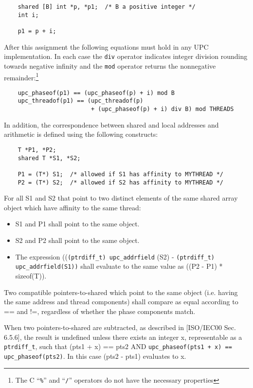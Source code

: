 \documentclass[12pt,titlepage]{article}
\newcounter{parnum}
\newcommand\np{\addtocounter{parnum}{1}\hspace{-2em}\makebox[2em][l]{\arabic{parnum}}}
\begin{document}
      
\begin{verbatim}
    shared [B] int *p, *p1;  /* B a positive integer */ 
    int i;  

    p1 = p + i;  
\end{verbatim}
    
\np After this assignment the following equations must hold
   in any UPC implementation.  In each case the {\tt div} operator
   indicates integer division rounding towards negative infinity and
   the {\tt mod} operator returns the nonnegative
   remainder:\footnote{The C ``{\tt \%}'' and ``{\tt /}''
   operators do not have the necessary properties}

    
\begin{verbatim}
    upc_phaseof(p1) == (upc_phaseof(p) + i) mod B 
    upc_threadof(p1) == (upc_threadof(p) 
                         + (upc_phaseof(p) + i) div B) mod THREADS 
\end{verbatim}    

\np In addition, the correspondence between shared and
   local addresses and arithmetic is defined using the following
   constructs:

\begin{verbatim}
    T *P1, *P2;  
    shared T *S1, *S2;  

    P1 = (T*) S1;  /* allowed if S1 has affinity to MYTHREAD */ 
    P2 = (T*) S2;  /* allowed if S2 has affinity to MYTHREAD */ 
\end{verbatim}    
    

\np For all S1 and S2 that point to two distinct elements of
   the same shared array object which have affinity to the same
   thread:

\begin{itemize}
\item S1 and P1 shall point to the same object. 
\item S2 and P2 shall point to the same object. 
\item The expression (({\tt (ptrdiff\_t) upc\_addrfield} (S2) -  {\tt (ptrdiff\_t) upc\_addrfield(S1))} shall 
   evaluate to the same value as ((P2 - P1) * sizeof(T)).  
\end{itemize}

\np Two compatible pointers-to-shared which point to the same
    object (i.e. having the same address and thread components) shall
    compare as equal according to == and !=, regardless of whether the 
    phase components match.

\np When two pointers-to-shared are subtracted, as described in
    [ISO/IEC00 Sec. 6.5.6], the result is undefined unless there exists
    an integer x, representable as a {\tt ptrdiff\_t}, such that (pts1 + x) == pts2
    AND {\tt upc\_phaseof(pts1 + x) == upc\_phaseof(pts2)}.
    In this case (pts2 - pts1) evaluates to x.
\end{document}
